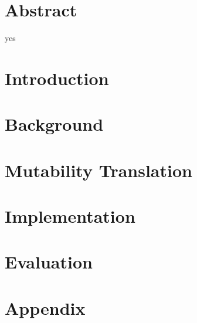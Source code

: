 \frontmatter
\chapter*{Abstract}
yes


\tableofcontents

\mainmatter

\chapter{Introduction}


\chapter{Background}
\label{background}


\chapter{Mutability Translation}
\label{translation}


\chapter{Implementation}
\label{implementation}


\chapter{Evaluation}
\label{evaluation}



\appendix




\chapter{Appendix}

